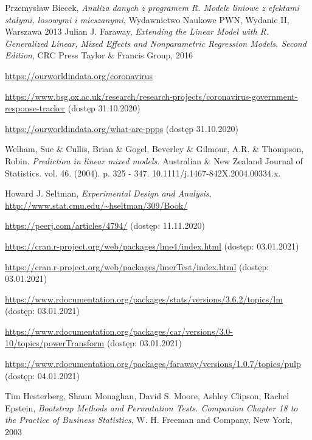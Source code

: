 \documentclass[12pt]{mwbk}
\theoremstyle{plain}
\theoremstyle{definition}
\theoremstyle{remark}
\begin{document}
\begin{thebibliography}{99}



 Przemysław Biecek, \emph{Analiza danych z programem R. Modele liniowe z efektami stałymi, losowymi i mieszanymi}, Wydawnictwo Naukowe PWN, Wydanie II, Warszawa 2013
 Julian J. Faraway, \emph{Extending the Linear Model with R. Generalized Linear, Mixed Effects and Nonparametric Regression Models. Second Edition}, CRC Press Taylor \& Francis  Group, 2016

 \url{https://ourworldindata.org/coronavirus}

 \url{https://www.bsg.ox.ac.uk/research/research-projects/coronavirus-government-response-tracker} (dostęp 31.10.2020)

 \url{https://ourworldindata.org/what-are-ppps} (dostęp 31.10.2020)

 Welham, Sue \& Cullis, Brian \& Gogel, Beverley \& Gilmour, A.R. \& Thompson, Robin. \emph{Prediction in linear mixed models.} Australian \& New Zealand Journal of Statistics. vol. 46.  (2004). p.  325 - 347. 10.1111/j.1467-842X.2004.00334.x. 

 Howard J. Seltman, \emph{Experimental Design and Analysis}, \url{http://www.stat.cmu.edu/~hseltman/309/Book/}

 \url{https://peerj.com/articles/4794/} (dostęp: 11.11.2020)

 \url{https://cran.r-project.org/web/packages/lme4/index.html} (dostęp: 03.01.2021)

 \url{https://cran.r-project.org/web/packages/lmerTest/index.html} (dostęp: 03.01.2021)

 \url{https://www.rdocumentation.org/packages/stats/versions/3.6.2/topics/lm} (dostęp: 03.01.2021)

 \url{https://www.rdocumentation.org/packages/car/versions/3.0-10/topics/powerTransform} (dostęp: 03.01.2021)


 \url{https://www.rdocumentation.org/packages/faraway/versions/1.0.7/topics/pulp} (dostęp: 04.01.2021)

 Tim Hesterberg, Shaun Monaghan, David S. Moore, Ashley Clipson, Rachel Epstein, \emph{Bootstrap Methods and Permutation Tests. Companion Chapter 18 to the Practice of Business Statistics}, W. H. Freeman and Company, New York, 2003


\end{thebibliography}
\end{document}
